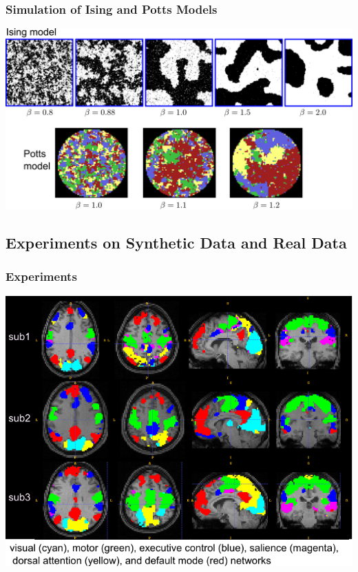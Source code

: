 \documentclass[sansserif, 10pt]{beamer}
\begin{document}
\begin{frame}
  \frametitle{Simulation of Ising and Potts Models}
    \includegraphics[width=1\textwidth]{sfig/simulations}\\
  \centering
\end{frame}

\subsection{Experiments on Synthetic Data and Real Data}
\begin{frame}
  \frametitle{Experiments}
  \includegraphics[width=1\textwidth]{sfig/m2_real}
\end{frame}
\end{document}
